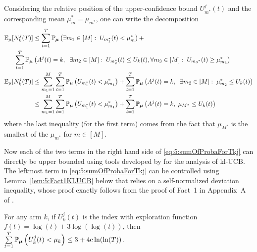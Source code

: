 \begin{smallproof}
  Considering the relative position of the upper-confidence bound $U_{m^*}^j(t)$ and the corresponding mean $\mu_m^* = \mu_{m^*}$, one can write the decomposition
  \begin{align}
    \mathbb{E}_{\mu}[N_k^j(T)] &\leq
    \sum_{t=1}^T\mathbb{P}_{\bm{\mu}} \left( \exists m_1 \in [M]: \; U_{m_1^*}(t) < \mu_m^* \right) + \nonumber \\
    \;\;\;\;
    \sum_{t=1}^T\mathbb{P}_{\bm{\mu}} & \left(A^j(t) = k,\;\; \exists m_2 \in [M]:\; U_{m_2^*}(t) \leq U_k(t) , \forall {m_3} \in [M]: \;  U_{{m_3}^*}(t) \geq \mu_{m_3}^* \right) \nonumber \\
    \mathbb{E}_{\mu}[N_k^j(T)] &\leq \sum_{m_1=1}^M\sum_{t=1}^T\mathbb{P}_{\bm{\mu}} \left(U_{m_1^*}(t) < \mu_{m_1}^* \right) + \sum_{t=1}^T\mathbb{P}_{\bm{\mu}} \left(A^j(t) = k,\;\; \exists m_2 \in [M]:\; \mu_{m_2}^* \leq U_k(t)\right) \notag \\
    & \leq \sum_{m_1=1}^M \sum_{t=1}^T \mathbb{P}_{\bm{\mu}} \left( U_{m_1^*}(t) < \mu_{m_1}^* \right)
    + \sum_{t=1}^T \mathbb{P}_{\bm{\mu}} \left( A^j(t) = k,\; \mu_{M^*} \leq U_k(t) \right)
    \label{eq:5:sumOfProbaForTkj}
  \end{align}
  where the last inequality (for the first term) comes from the fact that $\mu_{M^*}$ is the smallest of the $\mu_{m^*}$ for $m \in [M]$.

  Now each of the two terms in the right hand side of \eqref{eq:5:sumOfProbaForTkj} can directly be upper bounded using tools developed by \cite{KLUCBJournal} for the analysis of kl-UCB.
  The leftmost term in \eqref{eq:5:sumOfProbaForTkj} can be controlled using Lemma~\ref{lem:5:Fact1KLUCB} below that relies on a self-normalized deviation inequality, whose proof exactly follows from the proof of Fact~1 in Appendix~A of \cite{KLUCBJournal}.

  \begin{lemma}\label{lem:5:Fact1KLUCB}
  \begin{leftbar}[lemmabar]  %
      For any arm $k$, if $U_k^{j}(t)$ is the \klUCB{} index with exploration function $f(t)=\log(t)+3\log(\log(t))$, then
      $\sum\limits_{t=1}^T \mathbb{P}_{\bm{\mu}} \left(U_k^{j}(t) < \mu_k\right) \leq 3 + 4 \mathrm{e} \ln(\ln(T))$.
  \end{leftbar}  %
  \end{lemma}


\end{smallproof}
